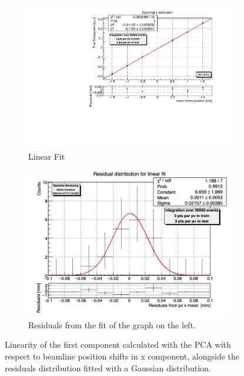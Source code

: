 \begin{figure}
    \centering
    \begin{subfigure}{0.48\textwidth}
    \includegraphics[width=\linewidth]{figures/x_fit_MC.pdf}
    \caption{Linear Fit}\label{fig:xfit_MC}
    \end{subfigure}
    \begin{subfigure}{0.48\textwidth}
    \includegraphics[width=\linewidth]{figures/x_res_MC.png}
    \caption{Residuals from the fit of the graph on the left. }\label{fig:xres_MC}
    \end{subfigure}
    \caption{Linearity of the first component calculated with the PCA with respect to beamline position shifts in x component, alongside the residuals distribution fitted with a Gaussian distribution.}
    \label{fig:x_MC}
\end{figure}


